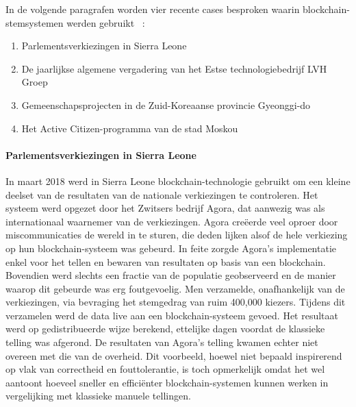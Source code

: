 			In de volgende paragrafen worden vier recente cases besproken waarin blockchain-stemsystemen werden gebruikt ~\autocite{Kshetri2018}:
			\begin{enumerate}
				\item Parlementsverkiezingen in Sierra Leone
				\item De jaarlijkse algemene vergadering van het Estse technologiebedrijf LVH Groep
				\item Gemeenschapsprojecten in de Zuid-Koreaanse provincie Gyeonggi-do
				\item Het Active Citizen-programma van de stad Moskou
			\end{enumerate}
				
				\paragraph{Parlementsverkiezingen in Sierra Leone}
				In maart 2018 werd in Sierra Leone blockchain-technologie gebruikt om een kleine deelset van de resultaten van de nationale verkiezingen te controleren. Het systeem werd opgezet door het Zwitsers bedrijf Agora, dat aanwezig was als internationaal waarnemer van de verkiezingen. Agora creëerde veel oproer door miscommunicaties de wereld in te sturen, die deden lijken alsof de hele verkiezing op hun blockchain-systeem was gebeurd. In feite zorgde Agora's implementatie enkel voor het tellen en bewaren van resultaten op basis van een blockchain. Bovendien werd slechts een fractie van de populatie geobserveerd en de manier waarop dit gebeurde was erg foutgevoelig. Men verzamelde, onafhankelijk van de verkiezingen, via bevraging het stemgedrag van ruim 400,000 kiezers. Tijdens dit verzamelen werd de data live aan een blockchain-systeem gevoed. Het resultaat werd op gedistribueerde wijze berekend, ettelijke dagen voordat de klassieke telling was afgerond. De resultaten van Agora's telling kwamen echter niet overeen met die van de overheid. Dit voorbeeld, hoewel niet bepaald  inspirerend op vlak van correctheid en fouttolerantie, is toch opmerkelijk omdat het wel aantoont hoeveel sneller en efficiënter blockchain-systemen kunnen werken in vergelijking met klassieke manuele tellingen. ~\autocite{Kshetri2018}
				
